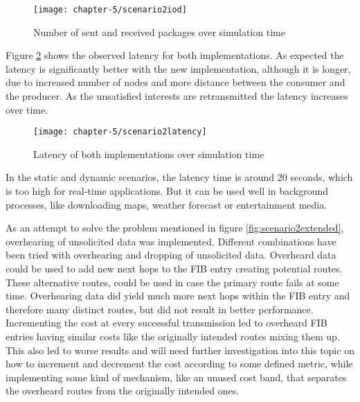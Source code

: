 \begin{figure}[H]
  \centering
  \texttt{[image: chapter-5/scenario2iod]}
  \caption{Number of sent and received packages over simulation time}
  \label{fig:scenario2iod}
\end{figure}

Figure \ref{fig:scenario2latency} shows the observed latency for both implementations. As expected the latency is significantly better with the new implementation, although it is longer, due to increased number of nodes and more distance between the consumer and the producer. As the unsatisfied interests are retransmitted the latency increases over time.

\begin{figure}[H]
  \centering
  \texttt{[image: chapter-5/scenario2latency]}
  \caption{Latency of both implementations over simulation time}
  \label{fig:scenario2latency}
\end{figure}

In the static and dynamic scenarios, the latency time is around 20 seconds, which is too high for real-time applications. But it can be used well in background processes, like downloading maps, weather forecast or entertainment media.

As an attempt to solve the problem mentioned in figure \ref{fig:scenario2extended}, overhearing of unsolicited data was implemented. Different combinations have been tried with overhearing and dropping of unsolicited data. Overheard data could be used to add new next hops to the FIB entry creating potential routes. These alternative routes, could be used in case the primary route fails at some time. Overhearing data did yield much more next hops within the FIB entry and therefore many distinct routes, but did not result in better performance. Incrementing the cost at every successful transmission led to overheard FIB entries having similar costs like the originally intended routes mixing them up. This also led to worse results and will need further investigation into this topic on how to increment and decrement the cost according to some defined metric, while implementing some kind of mechanism, like an unused cost band, that separates the overheard routes from the originally intended ones.


